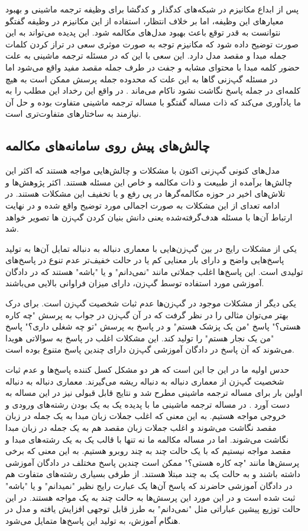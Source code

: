 پس از ابداع مکانیزم
در شبکه‌های کدگذار و کدگشا برای وظیفه ترجمه ماشینی و بهبود معیار‌های این وظیفه، اما بر خلاف انتظار، استفاده از این مکانیزم در وظیفه گفتگو نتوانست به قدر توقع باعث بهبود مدل‌های مکالمه شود. این پدیده می‌تواند به این صورت توضیح داده‌ شود که مکانیزم توجه به صورت موثری سعی در تراز کردن کلمات جمله مبدا و مقصد مدل دارد. این سعی با این که در مسئله ترجمه ماشینی به علت حضور کلمه مبدا با محتوای مشابه و جفت در طرف جمله مقصد مفید واقع می‌شود اما در مسئله گپ‌زنی گاها به این علت که محدوده جمله پرسش ممکن است به هیچ کلمه‌ای در جمله پاسخ نگاشت نشود ناکام می‌ماند
\cite{Gao_Neural_Approaches}.
در واقع این رخداد این مطلب را به ما یادآوری می‌کند که ذات مساله گفتگو با مساله ترجمه ماشینی متفاوت بوده و حل آن نیازمند به ساختارهای متفاوت‌تری است.

\subsection{چالش‌های پیش روی سامانه‌های مکالمه}
مدل‌های کنونی گپ‌زنی اکنون با مشکلات و چالش‌هایی مواجه هستند که اکثر این چالش‌ها برآمده از طبیعت و ذات مکالمه و خاص این مسئله هستند. اکثر پژوهش‌ها و تلاش‌های اخیر در حوزه مکالمه‌گرها در پی رفع و یا تخفیف این مشکلات هستند. در ادامه تعدای از این مشکلات 
به صورت اجمالی مورد توضیح واقع شده و در نهایت ارتباط آن‌ها با مسئله هدف‌گرفته‌شده یعنی دانش بنیان کردن گپ‌زن ها تصویر خواهد شد.

یکی از مشکلات رایج در بین گپ‌زن‌هایی با معماری دنباله به دنباله تمایل آن‌ها به تولید پاسخ‌هایی واضح و دارای بار معنایی کم یا در حالت  خفیف‌تر عدم تنوع در پاسخ‌های تولیدی است. این پاسخ‌ها اغلب جملاتی مانند 
"نمی‌دانم" و یا "باشه" هستند که در دادگان آموزشی مورد استفاده توسط گپ‌زن، دارای میزان فراوانی بالایی می‌باشند.

یکی دیگر از مشکلات موجود در گپ‌زن‌ها عدم ثبات شخصیت گپ‌زن است. برای درک بهتر می‌توان مثالی را در نظر گرفت که در آن گپ‌زن در جواب به پرسش "چه کاره هستی؟" پاسخ "من یک پزشک هستم" و در پاسخ به پرسش "تو چه شغلی داری؟" پاسخ "من یک نجار هستم" را تولید کند. این مشکلات اغلب در پاسخ به سوالاتی هویدا می‌شوند که آن پاسخ در دادگان آموزشی گپ‌زن دارای چندین پاسخ متنوع بوده است.

حدس اولیه ما در این جا این است که هر دو مشکل کسل کننده پاسخ‌ها و عدم ثبات شخصیت گپ‌زن از معماری دنباله به دنباله ریشه می‌گیرند. معماری دنباله به دنباله اولین بار برای مساله ترجمه ماشینی مطرح شد و نتایج قابل قبولی نیز در این مساله به دست آورد
\cite{seq2seq_paper}.
در مساله ترجمه ماشینی ما با پدیده یک به یک بودن رشته‌های ورودی و خروجی مواجه هستیم. به این معنی که اغلب جملات زبان مبدا به یک جمله در زبان مقصد نگاشت می‌شوند و اغلب جملات زبان مقصد هم به یک جمله در زبان مبدا نگاشت می‌شوند. اما در مساله مکالمه ما نه تنها با قالب یک به یک رشته‌های مبدا و مقصد مواجه نیستیم که با یک حالت چند به چند روبرو هستیم. به این معنی که برخی پرسش‌ها مانند "چه کاره هستی؟" ممکن است چندین پاسخ مختلف در دادگان آموزشی داشته باشند و به حالت یک به چند مبتلا هستند. از طرفی بسیاری رشته‌های متفاوت هم در دادگان آموزشی حاضرند که پاسخ آن‌ها یک عبارت رایج نظیر "نمیدانم" و یا "باشه" ثبت شده است و در این مورد این پرسش‌ها به حالت چند به یک مواجه هستند. در این حالت توزیع پیشین  عباراتی مثل "نمی‌دانم" به طرز قابل توجهی افزایش یافته و مدل در هنگام آموزش، به تولید این پاسخ‌ها متمایل می‌شود.

